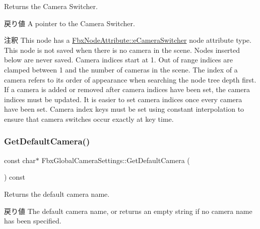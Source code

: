 Returns the Camera Switcher. \begin{DoxyReturn}{戻り値}
A pointer to the Camera Switcher. 
\end{DoxyReturn}
\begin{DoxyRemark}{注釈}
This node has a {\ttfamily \hyperlink{class_fbx_node_attribute_a08e1669d3d1a696910756ab17de56d6aa6fb598a32379261ed00d4695863a58fc}{Fbx\+Node\+Attribute\+::e\+Camera\+Switcher}} node attribute type. This node is not saved when there is no camera in the scene. Nodes inserted below are never saved. Camera indices start at 1. Out of range indices are clamped between 1 and the number of cameras in the scene. The index of a camera refers to its order of appearance when searching the node tree depth first. If a camera is added or removed after camera indices have been set, the camera indices must be updated. It is easier to set camera indices once every camera have been set. Camera index keys must be set using constant interpolation to ensure that camera switches occur exactly at key time. 
\end{DoxyRemark}
\mbox{\label{class_fbx_global_camera_settings_ab2f43528a6d09862bc735d7695af9868}} 
\subsubsection{\texorpdfstring{Get\+Default\+Camera()}{GetDefaultCamera()}}
{\footnotesize\ttfamily const char$\ast$ Fbx\+Global\+Camera\+Settings\+::\+Get\+Default\+Camera (\begin{DoxyParamCaption}{ }\end{DoxyParamCaption}) const}

Returns the default camera name. \begin{DoxyReturn}{戻り値}
The default camera name, or returns an empty string if no camera name has been specified. 
\end{DoxyReturn}
\mbox{\label{class_fbx_global_camera_settings_a458ad62da44fe9f580550162832edbb9}} 
